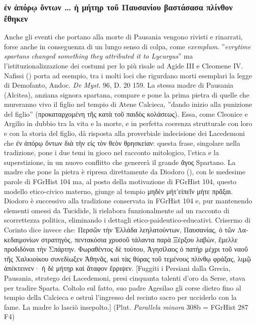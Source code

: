 {            \subsubsection{\textgreek{ἐν ἀπόρῳ ὄντων … ἡ μήτηρ τοῦ Παυσανίου βαστάσασα πλίνθον ἔθηκεν}}
            Anche gli eventi che portano alla morte di Pausania  vengono rivisti e rinarrati, forse anche in conseguenza di un lungo senso di colpa, come \emph{exemplum}. \cite[192]{Flower2002} ''\emph{evrytime spartans changed something they attributed it to Lycurgus}'' ma l'istituzionalizzazione dei costumi per lo più risale ad Agide III e Cleomene IV. Nafissi (\cite*[168]{Nafissi2004}) porta ad esempio, tra i molti loci che rigurdano morti esemplari la legge di Demofanto, Andoc. \emph{De Myst.} 96, D. 20 159. La stessa madre di Pausania  (Alcitea), anziana signora spartana, compare e pone la prima pietra di quelle che mureranno vivo il figlio nel tempio di Atene Calcieca, ''dando inizio alla punizione del figlio''  (\textgreek{προκαταρχομένη τῆς κατὰ τοῦ παιδὸς κολάσεως}). Essa, come Cleonice e Argilio  in dubbio tra la vita e la morte, e in perfetta coerenza strutturale con loro e con la storia del figlio, dà risposta alla proverbiale indecisione dei Lacedemoni che \textgreek{ἐν ἀπόρῳ ὄντων διὰ τὴν εἰς τὸν θεὸν θρησκείαν}: questa frase, singolare nella tradizione, pone i due temi in gioco nel racconto mitologico, l'etica e la superstizione, in un nuovo conflitto che genererà il grande \textgreek{ἄγος} Spartano. La madre che pone la pietra è ripresa direttamente da  Diodoro (\cite[115]{Ogden2002}), con le medesime parole di FGrHist 104 ma, al posto della motivazione di FGrHist 104, questo modello etico-civico materno, giunge al tempio \textgreek{μηδὲν μήτ'εἰπεῖν μήτε πρᾶξαι}.  Diodoro è successivo alla tradizione conservata in FGrHist 104 e, pur mantenendo elementi omessi da Tucidide, li rielabora funzionalmente ad un racconto di scorrettezza politica, eliminando i dettagli etico-paideutico-educativi.  Crisermo di Corinto dice invece che: \textgreek{Περσῶν τὴν Ἑλλάδα λεηλατούντων, Παυσανίας, ὁ τῶν Λακεδαιμονίων στρατηγὸς, πεντακόσια χρυσοῦ τάλαντα παρὰ Ξέρξου λαβὼν, ἔμελλε προδιδόναι τὴν Σπάρτην. Φωραθέντος δὲ τούτου, Ἀγησίλαος ὁ πατὴρ μέχρι τοῦ ναοῦ τῆς Χαλκιοίκου συνεδίωξεν Ἀθηνᾶς, καὶ τὰς θύρας τοῦ τεμένους πλίνθῳ φράξας, λιμῷ ἀπέκτεινεν· ἡ δὲ μήτηρ καὶ ἄταφον ἔρριψεν.}  [Fuggiti i Persiani dalla Grecia, Pausania, stratego dei Lacedemoni, presi cinquanta talenti d'oro da Serse, stava per tradire Sparta. Coltolo sul fatto, suo padre Agesilao gli corse dietro fino al tempio della Calcieca e ostruì l'ingresso del recinto sacro per ucciderlo con la fame. La madre lo lasciò insepolto.] (Plut. \emph{Parallela minora} 308b = FGrHist 287 F4)
}
